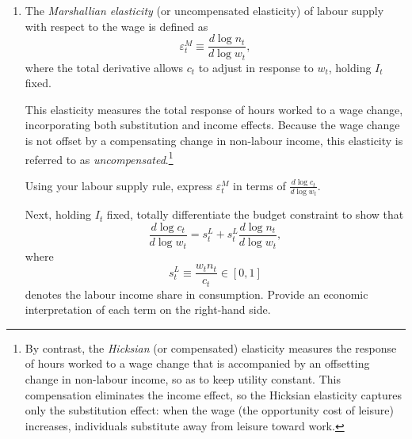 \documentclass[dvipsnames,11pt]{article}
\begin{document}
\begin{enumerate}
\begin{solution}
Equations $(2.4)$ is the labor supply rule. Since $c_t,\sigma,\phi>0$, obviously we have that labor supply $n_t$ increases in the wage $w_t$ when consumption $c_t$ is held fixed, and decreases in consumption $c_t$ when the wage $w_t$ is held fixed (the more you consume, the less you need to work). This condition pins down optimal labor supply. Working one extra hour raises income by $w_t$, which can be converted into consumption; the resulting utility gain is $u_c(c_t,n_t)\,w_t$. The utility cost is the marginal disutility of work, $-u_n(c_t,n_t)$. Optimality requires these two effects to balance, so that the marginal value of an extra hour worked equals its marginal cost in utility terms.
                
        \end{solution}

        \item The \textit{Marshallian elasticity} (or uncompensated elasticity) of labour supply with respect to the wage is defined as
        \[
        \varepsilon_t^{M} \equiv \frac{d \log n_t}{d \log w_t},
        \]
        where the total derivative allows $c_t$ to adjust in response to $w_t$, holding $I_t$ fixed.
        
        This elasticity measures the total response of hours worked to a wage change, incorporating both substitution and income effects. Because the wage change is not offset by a compensating change in non-labour income, this elasticity is referred to as \textit{uncompensated}.\footnote{By contrast, the \textit{Hicksian} (or compensated) elasticity measures the response of hours worked to a wage change that is accompanied by an offsetting change in non-labour income, so as to keep utility constant. This compensation eliminates the income effect, so the Hicksian elasticity captures only the substitution effect: when the wage (the opportunity cost of leisure) increases, individuals substitute away from leisure toward work.}
        
        Using your labour supply rule, express $\varepsilon_t^{M}$ in terms of $\frac{d \log c_t}{d \log w_t}$.
        
        Next, holding $I_t$ fixed, totally differentiate the budget constraint to show that
        \[
        \frac{d \log c_t}{d \log w_t}
        =
        s_t^L
        +
        s_t^L \frac{d \log n_t}{d \log w_t},
        \]
        where 
        \[
        s_t^L \equiv \frac{w_t n_t}{c_t} \in [0,1]
        \]
        denotes the labour income share in consumption. Provide an economic interpretation of each term on the right-hand side.
        

\end{enumerate}
\end{document}
